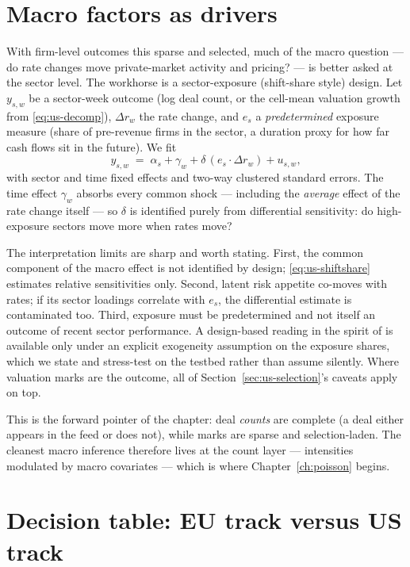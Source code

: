 \section{Macro factors as drivers}
\label{sec:us-macro}

With firm-level outcomes this sparse and selected, much of the macro question --- do rate
changes move private-market activity and pricing? --- is better asked at the sector level.
The workhorse is a sector-exposure (shift-share style) design. Let $y_{s,w}$ be a
sector-week outcome (log deal count, or the cell-mean valuation growth from
\eqref{eq:us-decomp}), $\Delta r_w$ the rate change, and $e_s$ a \emph{predetermined}
exposure measure (share of pre-revenue firms in the sector, a duration proxy for how far
cash flows sit in the future). We fit
\begin{equation}
y_{s,w} \;=\; \alpha_s + \gamma_w + \delta\,(e_s \cdot \Delta r_w) + u_{s,w},
\label{eq:us-shiftshare}
\end{equation}
with sector and time fixed effects and two-way clustered standard errors. The time effect
$\gamma_w$ absorbs every common shock --- including the \emph{average} effect of the rate
change itself --- so $\delta$ is identified purely from differential sensitivity: do
high-exposure sectors move more when rates move?

The interpretation limits are sharp and worth stating. First, the common component of the
macro effect is not identified by design; \eqref{eq:us-shiftshare} estimates relative
sensitivities only. Second, latent risk appetite co-moves with rates; if its sector
loadings correlate with $e_s$, the differential estimate is contaminated too. Third,
exposure must be predetermined and not itself an outcome of recent sector performance. A
design-based reading in the spirit of \cite{imbens2015} is available only under an
explicit exogeneity assumption on the exposure shares, which we state and stress-test on
the testbed rather than assume silently. Where valuation marks are the outcome, all of
Section~\ref{sec:us-selection}'s caveats apply on top.

This is the forward pointer of the chapter: deal \emph{counts} are complete (a deal either
appears in the feed or does not), while marks are sparse and selection-laden. The cleanest
macro inference therefore lives at the count layer --- intensities modulated by macro
covariates --- which is where Chapter~\ref{ch:poisson} begins.

\section{Decision table: EU track versus US track}
\label{sec:us-decision}

